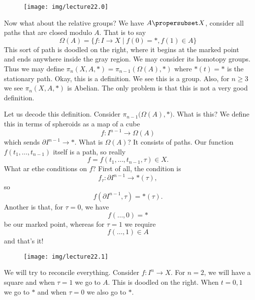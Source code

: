 \begin{wrapfigure}{r}{1.5in}
  \centering
  \texttt{[image: img/lecture22.0]}
\end{wrapfigure}\noindent\ignorespaces %
Now what about the relative groups? We have $A\propersubset X$,
consider all paths that are closed modulo $A$. That is to say
\begin{equation}
\Omega(A)=\{f\colon I\to X\mid f(0)=*, f(1)\in A\}
\end{equation}
This sort of path is doodled on the right, where it begins at the
marked point and ends anywhere inside the gray region.
We may consider its homotopy groups.
Thus we may define $\pi_{n}(X,A,*)=\pi_{n-1}(\Omega(A),*)$ where
$*(t)=*$ is the stationary path. Okay, this is a definition. We
see this is a group. Also, for $n\geq3$ we see $\pi_{n}(X,A,*)$
is Abelian. The only problem is that this is not a very good
definition. 

Let us decode this definition. Consider
$\pi_{n-1}\bigl(\Omega(A),*\bigr)$. What is this? We define this
in terms of spheroids as a map of a cube
\begin{equation}
f\colon I^{n-1}\to\Omega(A)
\end{equation}
which sends $\partial I^{n-1}\to*$. What is $\Omega(A)$? It
consists of paths. Our function $f(t_1,\dots,t_{n-1})$ itself is
a path, so really
\begin{equation}
f=f(t_1,\dots,t_{n-1},\tau)\in X.
\end{equation}
What ar ethe conditions on $f$? First of all, the condition is
\begin{equation}
f_{\tau}\colon\partial I^{n-1}\to *(\tau),
\end{equation}
so
\begin{equation}
f(\partial I^{n-1},\tau)=*(\tau).
\end{equation}
Another is that, for $\tau=0$, we have
\begin{equation}
f(\dots,0)=*
\end{equation}
be our marked point, whereas for $\tau=1$ we require
\begin{equation}
f(\dots,1)\in A
\end{equation}
and that's it!

\begin{wrapfigure}{r}{1.5in}
  \vspace{-30pt}
  \centering
  \texttt{[image: img/lecture22.1]}
  \vspace{-24pt}
\end{wrapfigure}
We will try to reconcile everything. Consider $f\colon I^n\to X$.
For $n=2$, we will have a square and when $\tau=1$ we go to
$A$. This is doodled on the right. When $t=0,1$ we go to $*$ and
when $\tau=0$ we also go to $*$.

